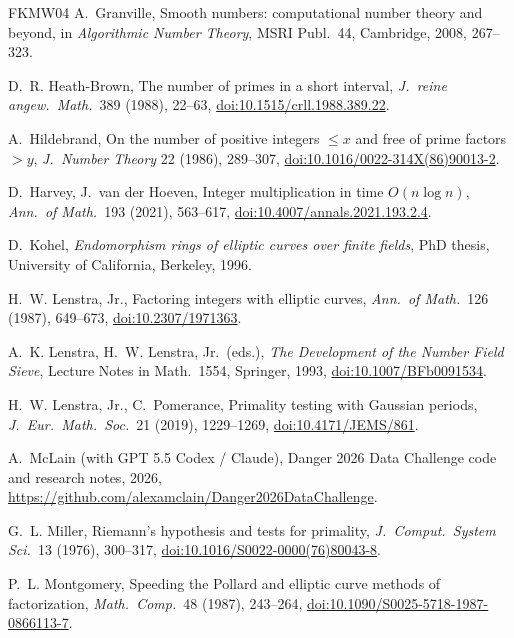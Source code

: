 \documentclass[11pt]{amsart}
\theoremstyle{plain}
\theoremstyle{definition}
\theoremstyle{remark}
\begin{document}
\begin{thebibliography}{FKMW04}
 A.~Granville, Smooth numbers: computational number theory and beyond, in
\emph{Algorithmic Number Theory}, MSRI Publ.\ 44, Cambridge, 2008, 267--323.

 D.~R. Heath-Brown, The number of primes in a short interval, \emph{J.~reine
angew.\ Math.}\ 389 (1988), 22--63, \href{https://doi.org/10.1515/crll.1988.389.22}{doi:10.1515/crll.1988.389.22}.

 A.~Hildebrand, On the number of positive integers $\le x$ and free of prime
factors $> y$, \emph{J.~Number Theory} 22 (1986), 289--307, \href{https://doi.org/10.1016/0022-314X(86)90013-2}{doi:10.1016/0022-314X(86)90013-2}.

 D.~Harvey, J.~van der Hoeven, Integer multiplication in time $O(n\log n)$,
\emph{Ann.\ of Math.}\ 193 (2021), 563--617, \href{https://doi.org/10.4007/annals.2021.193.2.4}{doi:10.4007/annals.2021.193.2.4}.

 D.~Kohel, \emph{Endomorphism rings of elliptic curves over finite fields},
PhD thesis, University of California, Berkeley, 1996.

 H.~W. Lenstra, Jr., Factoring integers with elliptic curves, \emph{Ann.\ of
Math.}\ 126 (1987), 649--673, \href{https://doi.org/10.2307/1971363}{doi:10.2307/1971363}.

 A.~K. Lenstra, H.~W. Lenstra, Jr.\ (eds.), \emph{The Development of the Number
Field Sieve}, Lecture Notes in Math.\ 1554, Springer, 1993, \href{https://doi.org/10.1007/BFb0091534}{doi:10.1007/BFb0091534}.

 H.~W. Lenstra, Jr., C.~Pomerance, Primality testing with Gaussian periods,
\emph{J.~Eur.\ Math.\ Soc.}\ 21 (2019), 1229--1269, \href{https://doi.org/10.4171/JEMS/861}{doi:10.4171/JEMS/861}.

 A.~McLain (with GPT 5.5 Codex / Claude), Danger 2026 Data Challenge code and
research notes, 2026, \url{https://github.com/alexamclain/Danger2026DataChallenge}.

 G.~L. Miller, Riemann's hypothesis and tests for primality, \emph{J.~Comput.\
System Sci.}\ 13 (1976), 300--317, \href{https://doi.org/10.1016/S0022-0000(76)80043-8}{doi:10.1016/S0022-0000(76)80043-8}.

 P.~L. Montgomery, Speeding the Pollard and elliptic curve methods of
factorization, \emph{Math.\ Comp.}\ 48 (1987), 243--264, \href{https://doi.org/10.1090/S0025-5718-1987-0866113-7}{doi:10.1090/S0025-5718-1987-0866113-7}.


\end{thebibliography}
\end{document}
